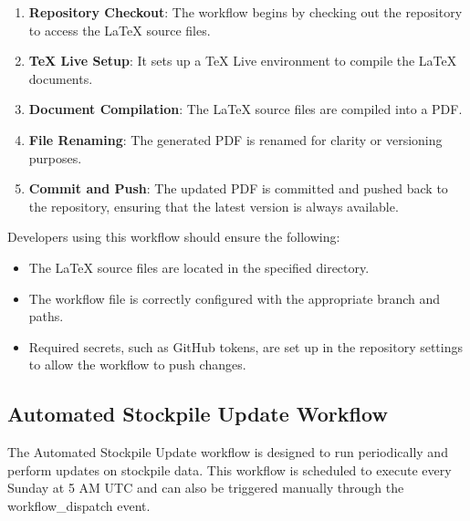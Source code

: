 \begin{enumerate}
\item \textbf{Repository Checkout}: The workflow begins by checking out the repository to access the LaTeX source files.
\item \textbf{TeX Live Setup}: It sets up a TeX Live environment to compile the LaTeX documents.
\item \textbf{Document Compilation}: The LaTeX source files are compiled into a PDF.
\item \textbf{File Renaming}: The generated PDF is renamed for clarity or versioning purposes.
\item \textbf{Commit and Push}: The updated PDF is committed and pushed back to the repository, ensuring that the latest version is always available.
\end{enumerate}


Developers using this workflow should ensure the following:

\begin{itemize}
\item The LaTeX source files are located in the specified directory.
\item The workflow file is correctly configured with the appropriate branch and paths.
\item Required secrets, such as GitHub tokens, are set up in the repository settings to allow the workflow to push changes.
\end{itemize}







\subsection{Automated Stockpile Update Workflow \label{Automated Stockpile Update Workflow}}

The Automated Stockpile Update workflow is designed to run periodically and perform updates on stockpile data. This workflow is scheduled to execute every Sunday at 5 AM UTC and can also be triggered manually through the workflow\_dispatch event.

